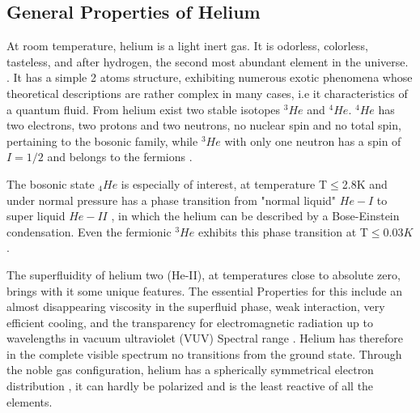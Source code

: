\subsection{General Properties of Helium}


At room temperature, helium is a light inert gas. It is odorless, colorless, tasteless, and after hydrogen, the second most abundant element in the universe.  \cite{enss_low-temperature_2005}. It has a simple 2 atoms structure, exhibiting numerous exotic phenomena whose theoretical descriptions are rather complex in many cases, i.e it characteristics of a quantum fluid. From helium exist two stable isotopes $^{3}He$ and $^{4}He$.  $^{4}He$ has two electrons, two protons and two neutrons, no nuclear spin and no total spin, pertaining to the bosonic family, while $^{3}He$ with only one neutron has a spin of $I = 1/2$ and belongs to the fermions \cite{atkins_liquid_2014}.

The bosonic state $_{4}He$ is especially of interest, at  temperature T$\leqslant$2.8K and under normal pressure has a phase transition from "normal liquid" $He-I$ to super liquid $He-II$ \cite{swenson_liquid-solid_1950}, in which the helium can be described by a Bose-Einstein condensation. Even the fermionic $^{3}He$ exhibits this phase transition at T$\leqslant 0.03K$ \cite{halperin_properties_1978}.

The superfluidity of helium two (He-II), at temperatures close to absolute zero, brings with it some unique features. The essential Properties for this include an almost disappearing viscosity in the superfluid phase, weak interaction, very efficient cooling, and the transparency for electromagnetic radiation up to wavelengths in vacuum ultraviolet (VUV) Spectral range \cite{enss_low-temperature_2005}. Helium has therefore in the complete visible spectrum no transitions from the ground state. Through the noble gas configuration, helium has a spherically symmetrical electron distribution \cite{lewis_Helium_2014}, it can hardly be polarized and is the least reactive of all the elements.

